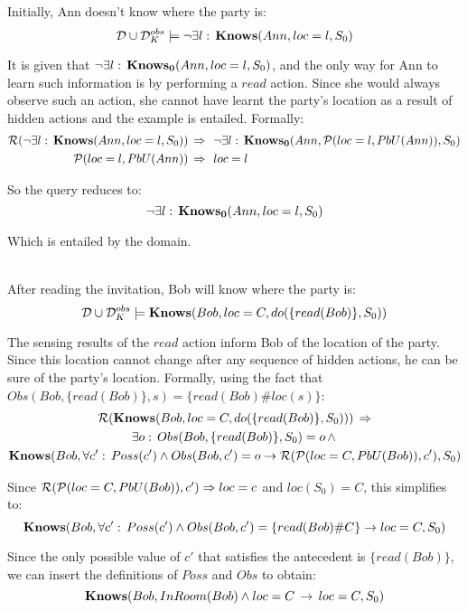 \begin{example}
Initially, Ann doesn't know where the party is:\[
\mathcal{D}\cup\mathcal{D}_{K}^{obs}\models\neg\exists l:\,\mathbf{Knows}(Ann,loc=l,S_{0})\]

\end{example}
It is given that $\neg\exists l:\,\mathbf{Knows_{0}}(Ann,loc=l,S_{0})$, and
the only way for Ann to learn such information is by performing a
$read$ action. Since she would always observe such an action, she
cannot have learnt the party's location as a result of hidden actions
and the example is entailed. Formally:\begin{align*}
\mathcal{R}(\neg\exists l:\,\mathbf{Knows}(Ann,loc=l,S_{0}))\,\Rightarrow\,\,\,\, & \neg\exists l:\,\mathbf{Knows_{0}}(Ann,\mathcal{P}(loc=l,PbU(Ann)),S_{0})\\
\mathcal{P}(loc=l,PbU(Ann))\,\Rightarrow\,\,\,\, & loc=l\end{align*}


So the query reduces to:\[
\neg\exists l:\,\mathbf{Knows_{0}}(Ann,loc=l,S_{0})\]


Which is entailed by the domain.\\
\\


\begin{example}
After reading the invitation, Bob will know where the party is:\[
\mathcal{D}\cup\mathcal{D}_{K}^{obs}\models\mathbf{Knows}(Bob,loc=C,do(\{read(Bob)\},S_{0}))\]

\end{example}
The sensing results of the $read$ action inform Bob of the location
of the party. Since this location cannot change after any sequence
of hidden actions, he can be sure of the party's location. Formally,
using the fact that $Obs(Bob,\{read(Bob)\},s)=\{read(Bob)\#loc(s)\}$:\begin{multline*}
\mathcal{R}(\mathbf{Knows}(Bob,loc=C,do(\{read(Bob)\},S_{0})))\,\Rightarrow\\
\exists o:\, Obs(Bob,\{read(Bob)\},S_{0})=o\,\wedge\,\\
\mathbf{Knows}(Bob,\forall c':\, Poss(c')\wedge Obs(Bob,c')=o\rightarrow\mathcal{R}(\mathcal{P}(loc=C,PbU(Bob)),c'),S_{0})\end{multline*}


Since $\mathcal{R}(\mathcal{P}(loc=C,PbU(Bob)),c')\Rightarrow loc=c$ and $loc(S_{0})=C$,
this simplifies to:\[
\mathbf{Knows}(Bob,\forall c':\, Poss(c')\wedge Obs(Bob,c')=\{read(Bob)\#C\}\rightarrow loc=C,S_{0})\]


Since the only possible value of $c'$ that satisfies the antecedent
is $\{read(Bob)\}$, we can insert the definitions of $Poss$ and
$Obs$ to obtain:\[
\mathbf{Knows}(Bob,InRoom(Bob)\wedge loc=C\,\rightarrow\, loc=C,S_{0})\]


